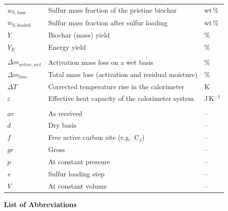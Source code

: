 {\begin{longtable}{L{3cm}L{9.2cm}L{2.5cm}}
\(w_{\mathrm{S,base}}\)      & Sulfur mass fraction of the pristine biochar                    & wt\,\%\\
\(w_{\mathrm{S,loaded}}\)    & Sulfur mass fraction after sulfur loading                        & wt\,\%\\
\(Y\)                        & Biochar (mass) yield                                            & \%\\
\(Y_E\)                      & Energy yield                                                    & \%\\
\addlinespace
{}\\
\addlinespace
\(\Delta m_{active,wet}\)    & Activation mass loss on a wet basis                             & \%\\
\(\Delta m_{loss}\)          & Total mass loss (activation and residual moisture)              & \%\\
\(\Delta T\)                 & Corrected temperature rise in the calorimeter                    & K\\
\(\varepsilon\)              & Effective heat capacity of the calorimeter system                & J\,K$^{-1}$\\
\addlinespace
{}\\
\addlinespace
\(ar\)                       & As received                                                     & --\\
\(d\)                        & Dry basis                                                       & --\\
\(f\)                        & Free active carbon site (e.g.\ C$_f$)                           & --\\
\(gr\)                       & Gross                                                           & --\\
\(p\)                        & At constant pressure                                            & --\\
\(s\)                        & Sulfur loading step                                             & --\\
\(V\)                        & At constant volume                                              & --\\
\bottomrule
\end{longtable}
}

\newpage

\addtocounter{table}{-1}
\bigskip
\Large \textsf{\textbf{List of Abbreviations}}
\normalsize
\vspace{0.5em}

